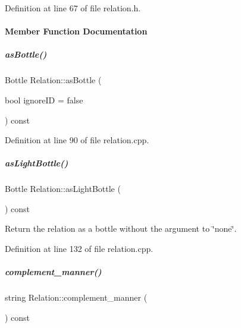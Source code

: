 Definition at line 67 of file relation.\+h.



\paragraph{Member Function Documentation}
\mbox{\label{group__icubclient__representations_abd8f5fd5ffde5d321e8c5ba9feb5e929}} 
\subparagraph{\texorpdfstring{as\+Bottle()}{asBottle()}}
{\footnotesize\ttfamily Bottle Relation\+::as\+Bottle (\begin{DoxyParamCaption}\item[{bool}]{ignore\+ID = {\ttfamily false} }\end{DoxyParamCaption}) const}



Definition at line 90 of file relation.\+cpp.

\mbox{\label{group__icubclient__representations_ad3b7769384f11727be8e4e9d491342f2}} 
\subparagraph{\texorpdfstring{as\+Light\+Bottle()}{asLightBottle()}}
{\footnotesize\ttfamily Bottle Relation\+::as\+Light\+Bottle (\begin{DoxyParamCaption}{ }\end{DoxyParamCaption}) const}



Return the relation as a bottle without the argument to \char`\"{}none\char`\"{}. 



Definition at line 132 of file relation.\+cpp.

\mbox{\label{group__icubclient__representations_afefea8d3d76cee06eeb88dcd04e4d39e}} 
\subparagraph{\texorpdfstring{complement\+\_\+manner()}{complement\_manner()}}
{\footnotesize\ttfamily string Relation\+::complement\+\_\+manner (\begin{DoxyParamCaption}{ }\end{DoxyParamCaption}) const}



